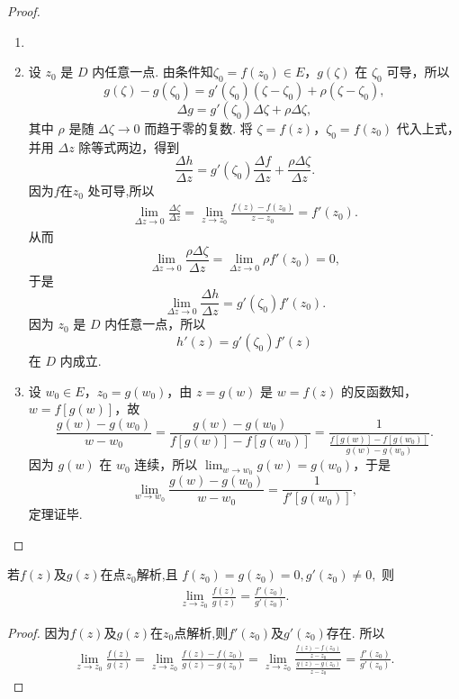 \documentclass[../../main.tex]{subfiles}%
\begin{document}
\begin{proof}
\begin{enumerate}[(1)]
\item 

\item 设 \( z_0 \) 是 \( D \) 内任意一点. 由条件知\( \zeta_0 = f(z_0) \in E \)，\( g(\zeta) \) 在 \( \zeta_0 \) 可导，所以
\[
g(\zeta) - g(\zeta_0) = g'(\zeta_0)(\zeta - \zeta_0) + \rho(\zeta - \zeta_0),
\]
\[
\Delta g = g'(\zeta_0)\Delta \zeta + \rho \Delta \zeta,
\]
其中 \( \rho \) 是随 \( \Delta \zeta \to 0 \) 而趋于零的复数. 将 \( \zeta = f(z) \)，\( \zeta_0 = f(z_0) \) 代入上式，并用 \( \Delta z \) 除等式两边，得到
\[
\frac{\Delta h}{\Delta z} = g'(\zeta_0)\frac{\Delta f}{\Delta z} + \frac{\rho \Delta \zeta}{\Delta z}.
\]
因为$f$在$z_0$ 处可导,所以
\begin{align*}
\lim_{\Delta z\rightarrow 0} \frac{\Delta \zeta}{\Delta z}=\lim_{z\rightarrow z_0} \frac{f\left( z \right) -f\left( z_0 \right)}{z-z_0}=f'\left( z_0 \right) .
\end{align*}
从而
\[
\lim_{\Delta z\rightarrow 0} \frac{\rho \Delta \zeta}{\Delta z}=\lim_{\Delta z\rightarrow 0} \rho f' \left( z_0 \right) =0,
\]
于是
\[
\lim_{\Delta z \to 0} \frac{\Delta h}{\Delta z} = g'(\zeta_0)f'(z_0).
\]
因为 \( z_0 \) 是 \( D \) 内任意一点，所以
\[
h'(z) = g'(\zeta_0)f'(z)
\]
在 \( D \) 内成立.

\item 设 \( w_0 \in E \)，\( z_0 = g(w_0) \)，由 \( z = g(w) \) 是 \( w = f(z) \) 的反函数知，\( w = f[g(w)] \)，故
\[
\frac{g(w) - g(w_0)}{w - w_0} = \frac{g(w) - g(w_0)}{f[g(w)] - f[g(w_0)]} = \frac{1}{\frac{f[g(w)] - f[g(w_0)]}{g(w) - g(w_0)}}.
\]
因为 \( g(w) \) 在 \( w_0 \) 连续，所以 \( \lim_{w \to w_0} g(w) = g(w_0) \)，于是
\[
\lim_{w \to w_0} \frac{g(w) - g(w_0)}{w - w_0} = \frac{1}{f'[g(w_0)]},
\]
定理证毕.
\end{enumerate}

\end{proof}

\begin{theorem}\label{theorem:L'Hospital(洛必达)法则}
若$f(z)$及$g(z)$在点$z_0$解析,且
$f(z_0)=g(z_0)=0,g'(z_0)\neq 0,$
则
\begin{align*}
\lim\limits_{z \to z_0} \frac{f(z)}{g(z)} = \frac{f'(z_0)}{g'(z_0)}.
\end{align*}
\end{theorem}
\begin{proof}

因为$f(z)$及$g(z)$在$z_0$点解析,则$f'(z_0)$及$g'(z_0)$存在.
所以
\begin{align*}
\lim\limits_{z \to z_0} \frac{f(z)}{g(z)} = \lim\limits_{z \to z_0} \frac{f(z)-f(z_0)}{g(z)-g(z_0)} = \lim\limits_{z \to z_0} \frac{\frac{f(z)-f(z_0)}{z-z_0}}{\frac{g(z)-g(z_0)}{z-z_0}} = \frac{f'(z_0)}{g'(z_0)}.
\end{align*}


\end{proof}
\end{document}
